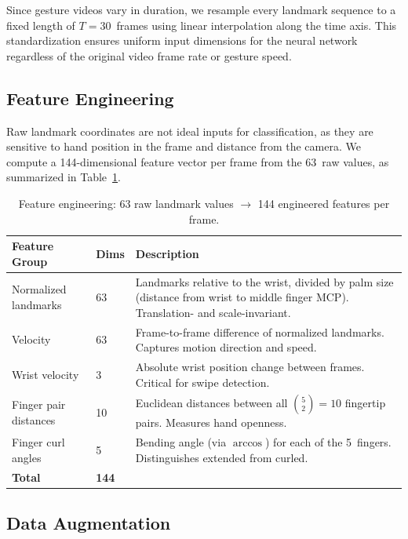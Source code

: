 Since gesture videos vary in duration, we resample every landmark
sequence to a fixed length of $T = 30$~frames using linear
interpolation along the time axis. This standardization ensures
uniform input dimensions for the neural network regardless of the
original video frame rate or gesture speed.

\subsection{Feature Engineering}
\label{subsec:features}

Raw landmark coordinates are not ideal inputs for classification, as they
are sensitive to hand position in the frame and distance from the camera.
We compute a 144-dimensional feature vector per frame from the 63~raw
values, as summarized in Table~\ref{tab:features}.

\begin{table}[ht]
\centering
\caption{Feature engineering: 63 raw landmark values $\to$ 144
  engineered features per frame.}
\label{tab:features}
\begin{tabular}{@{}llp{6.5cm}@{}}
\toprule
\textbf{Feature Group} & \textbf{Dims} & \textbf{Description} \\
\midrule
Normalized landmarks & 63 & Landmarks relative to the wrist, divided by palm size (distance from wrist to middle finger MCP). Translation- and scale-invariant. \\
Velocity & 63 & Frame-to-frame difference of normalized landmarks. Captures motion direction and speed. \\
Wrist velocity & 3 & Absolute wrist position change between frames. Critical for swipe detection. \\
Finger pair distances & 10 & Euclidean distances between all $\binom{5}{2}=10$ fingertip pairs. Measures hand openness. \\
Finger curl angles & 5 & Bending angle (via $\arccos$) for each of the 5~fingers. Distinguishes extended from curled. \\
\midrule
\textbf{Total} & \textbf{144} & \\
\bottomrule
\end{tabular}
\end{table}

\subsection{Data Augmentation}

